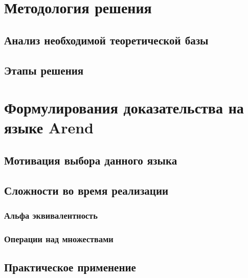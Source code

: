 \documentclass[times,specification,annotation]{itmo-student-thesis}
\begin{document}

\chapter{Методология решения}
\todo
\section{Анализ необходимой теоретической базы}
\todo
\section{Этапы решения}
\todo

\chapterconclusion

\chapter{Формулирования доказательства на языке Arend}
\todo
\section{Мотивация выбора данного языка}
\todo
\section{Сложности во время реализации}
\todo
\subsection{Альфа эквивалентность}
\todo
\subsection{Операции над множествами}
\todo
\section{Практическое применение}
\todo

\end{document}
